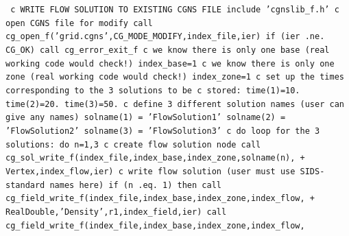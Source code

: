 \documentclass[12pt]{article}
\begin{document}
{\tt
\noindent c   WRITE FLOW SOLUTION TO EXISTING CGNS FILE
\newline\indent      include 'cgnslib\_f.h'
\newline c   open CGNS file for modify
\newline\indent      call cg\_open\_f('grid.cgns',CG\_MODE\_MODIFY,index\_file,ier)
\newline\indent      if (ier .ne. CG\_OK) call cg\_error\_exit\_f
\newline c   we know there is only one base (real working code would check!)
\newline\indent      index\_base=1
\newline c   we know there is only one zone (real working code would check!)
\newline\indent      index\_zone=1
\newline c   set up the times corresponding to the 3 solutions to be
\newline c   stored:
\newline\indent      time(1)=10.
\newline\indent      time(2)=20.
\newline\indent      time(3)=50.
\newline c   define 3 different solution names (user can give any names)
\newline\indent      solname(1) = 'FlowSolution1'
\newline\indent      solname(2) = 'FlowSolution2'
\newline\indent      solname(3) = 'FlowSolution3'
\newline c   do loop for the 3 solutions:
\newline\indent      do n=1,3
\newline c   create flow solution node
\newline\indent      call cg\_sol\_write\_f(index\_file,index\_base,index\_zone,solname(n),
\newline + \indent Vertex,index\_flow,ier)
\newline c   write flow solution (user must use SIDS-standard names here)
\newline\indent      if (n .eq. 1) then
\newline\indent      call cg\_field\_write\_f(index\_file,index\_base,index\_zone,index\_flow,
\newline + \indent RealDouble,'Density',r1,index\_field,ier)
\newline\indent      call cg\_field\_write\_f(index\_file,index\_base,index\_zone,index\_flow,
}
\end{document}
